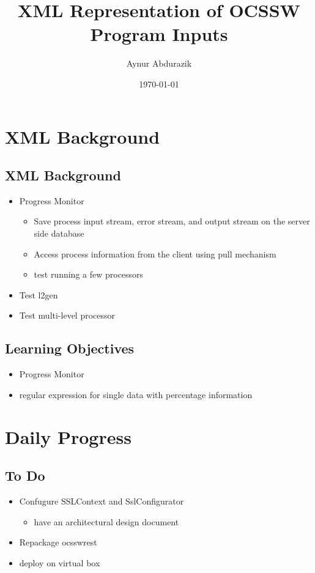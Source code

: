 \documentclass[11pt, oneside]{article}    %
\title{XML Representation of OCSSW Program Inputs}
\author{Aynur Abdurazik}
\date{\today}                            %
\begin{document}
        \maketitle


        \section*{\color{DarkGreen}XML Background}
        \subsection*{\color{DeepPink3}XML Background}
        \begin{itemize}
        \item Progress Monitor
        \begin{itemize}
        \item Save process input stream, error stream, and output stream on the server side database
        \item Access process information from the client using pull mechanism
        \item test running a few processors
        \end{itemize}
        \item Test l2gen
        \item Test multi-level processor
        \end{itemize}
        \subsection*{\color{DarkTurquoise}Learning Objectives}
        \begin{itemize}
        \item Progress Monitor
        \item regular expression for single data with percentage information
        \end{itemize}

        \pagebreak


        \section*{\color{DarkGreen}Daily Progress}
        \subsection*{\color{DeepPink3}To Do}
        \begin{itemize}
        \item Confugure SSLContext and SslConfigurator
        \begin{itemize}
        \item have an architectural design document
        \end{itemize}
        \item Repackage ocsswrest
        \item deploy on virtual box
        \end{itemize}
\end{document}
